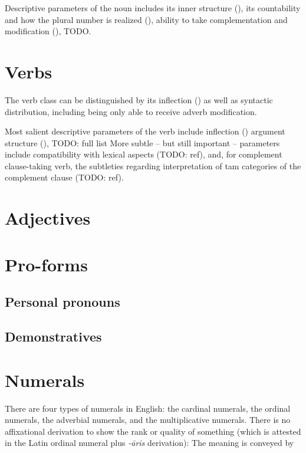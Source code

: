 \documentclass[UTF8, a4paper, oneside, scheme=plain, 12pt]{ctexbook}
\newcommand{\form}[1]{\emph{#1}}
\begin{document}
Descriptive parameters of the noun includes 
its inner structure (), 
its countability and how the plural number is realized (),
ability to take complementation and modification (), TODO.



\section{Verbs}\label{sec:pos.verb}

The verb class can be distinguished by its inflection ()
as well as syntactic distribution,
including being only able to receive adverb modification. 

Most salient descriptive parameters of the verb include
inflection ()
argument structure (),
TODO: full list
More subtle -- but still important -- parameters 
include compatibility with lexical aspects (TODO: ref), 
and, for complement clause-taking verb,
the subtleties regarding interpretation of \acs{tam} categories 
of the complement clause (TODO: ref).

\section{Adjectives}


\section{Pro-forms}

\subsection{Personal pronouns}

\subsection{Demonstratives}

\section{Numerals}

There are four types of numerals in English:
the cardinal numerals, 
the ordinal numerals,
the adverbial numerals,
and the multiplicative numerals.
There is no affixational derivation to show the rank or quality of something 
(which is attested in the Latin ordinal numeral plus \form{-āris} derivation):
The meaning is conveyed by 
\end{document}

